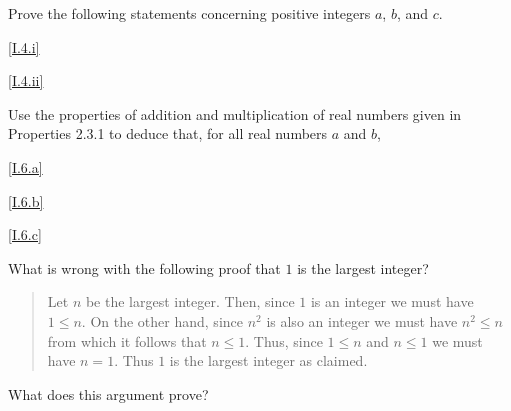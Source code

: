\documentclass{homework}
\newcommand{\AND}{\text{ and }}
\newcommand{\OR}{\text{ or }}
\newcommand{\divides}{\text{ divides }}
\begin{document}
\begin{problem}[Eccles I.4, p.53]
Prove the following statements concerning positive integers $a$, $b$, and $c$.
\end{problem}

\begin{solution}
\ref{I.4.i}

\ref{I.4.ii}

\end{solution}

\begin{problem}[Eccles I.6, p. 54]
Use the properties of addition and multiplication of real numbers given in
Properties 2.3.1 to deduce that, for all real numbers $a$ and $b$,
\end{problem}

\begin{solution}
\ref{I.6.a}

\ref{I.6.b}

\ref{I.6.c}

\end{solution}

\begin{problem}[Eccles I.10, p. 54]
What is wrong with the following proof that $1$ is the largest integer?
\begin{quote}
Let $n$ be the largest integer.
Then, since $1$ is an integer we must have $1 \leq n$.
On the other hand, since $n^2$ is also an integer we must have $n^2 \leq n$ from
which it follows that $n \leq 1$.
Thus, since $1 \leq n$ and $n \leq 1$ we must have $n = 1$.
Thus $1$ is the largest integer as claimed.
\end{quote}
What does this argument prove?
\end{problem}
\end{document}
